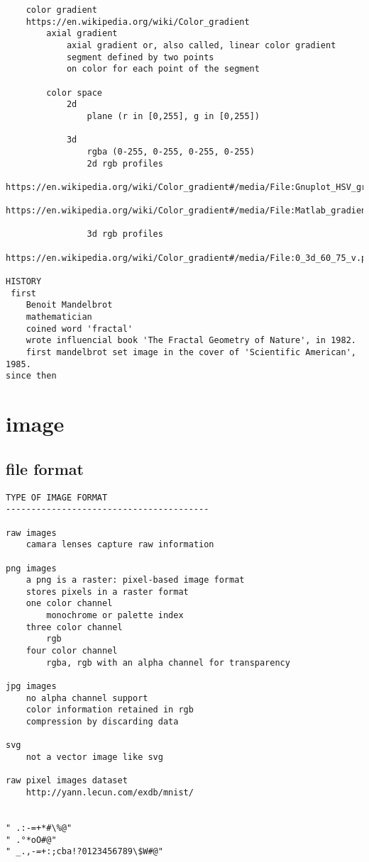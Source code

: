 \begin{verbatim}
    color gradient
    https://en.wikipedia.org/wiki/Color_gradient
        axial gradient
            axial gradient or, also called, linear color gradient
            segment defined by two points
            on color for each point of the segment

        color space
            2d
                plane (r in [0,255], g in [0,255])

            3d
                rgba (0-255, 0-255, 0-255, 0-255)
                2d rgb profiles
                https://en.wikipedia.org/wiki/Color_gradient#/media/File:Gnuplot_HSV_gradient.png
                https://en.wikipedia.org/wiki/Color_gradient#/media/File:Matlab_gradient.png

                3d rgb profiles
                https://en.wikipedia.org/wiki/Color_gradient#/media/File:0_3d_60_75_v.png

HISTORY
 first
    Benoit Mandelbrot
    mathematician
    coined word 'fractal'
    wrote influencial book 'The Fractal Geometry of Nature', in 1982.
    first mandelbrot set image in the cover of 'Scientific American', 1985.
since then
\end{verbatim}

\chapter{image}
\section{file format}
\begin{verbatim}
TYPE OF IMAGE FORMAT
----------------------------------------

raw images
    camara lenses capture raw information

png images
    a png is a raster: pixel-based image format
    stores pixels in a raster format
    one color channel
        monochrome or palette index
    three color channel
        rgb
    four color channel
        rgba, rgb with an alpha channel for transparency

jpg images
    no alpha channel support
    color information retained in rgb
    compression by discarding data

svg
    not a vector image like svg

raw pixel images dataset
    http://yann.lecun.com/exdb/mnist/


" .:-=+*#\%@"
" .°*oO#@"
" _.,-=+:;cba!?0123456789\$W#@"


\end{verbatim}

